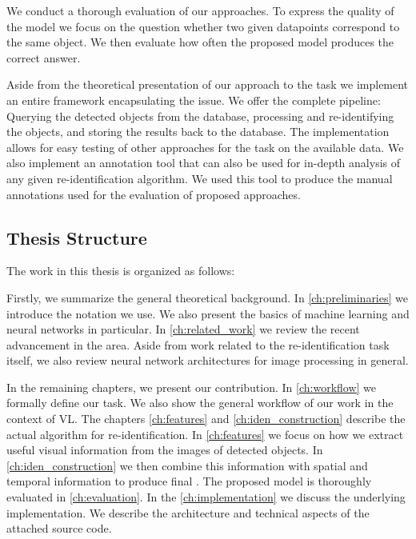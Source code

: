 We conduct a thorough evaluation of our approaches. To express the quality of the model we focus on the question whether two given datapoints correspond to the same object. We then evaluate how often the proposed model produces the correct answer.

Aside from the theoretical presentation of our approach to the \reid{} task we implement an entire framework encapsulating the issue. We offer the complete pipeline: Querying the detected objects from the database, processing and re-identifying the objects, and storing the results back to the database. The implementation allows for easy testing of other approaches for the \reid{} task on the available data. We also implement an annotation tool that can also be used for in-depth analysis of any given re-identification algorithm. We used this tool to produce the manual annotations used for the evaluation of proposed approaches.



\subsection*{Thesis Structure}

The work in this thesis is organized as follows:

Firstly, we summarize the general theoretical background. In \autoref{ch:preliminaries} we introduce the notation we use. We also present the basics of machine learning and neural networks in particular. In \autoref{ch:related_work} we review the recent advancement in the area. Aside from work related to the re-identification task itself, we also review neural network architectures for image processing in general.

In the remaining chapters, we present our contribution. In \autoref{ch:workflow} we formally define our task. We also show the general workflow of our work in the context of \gls{VL}. The chapters \ref{ch:features} and \ref{ch:iden_construction} describe the actual algorithm for re-identification. In \autoref{ch:features} we focus on how we extract useful visual information from the images of detected objects. In \autoref{ch:iden_construction} we then combine this information with spatial and temporal information to produce final \reid{}. The proposed model is thoroughly evaluated in \autoref{ch:evaluation}. In the \autoref{ch:implementation} we discuss the underlying implementation. We describe the architecture and technical aspects of the attached source code.